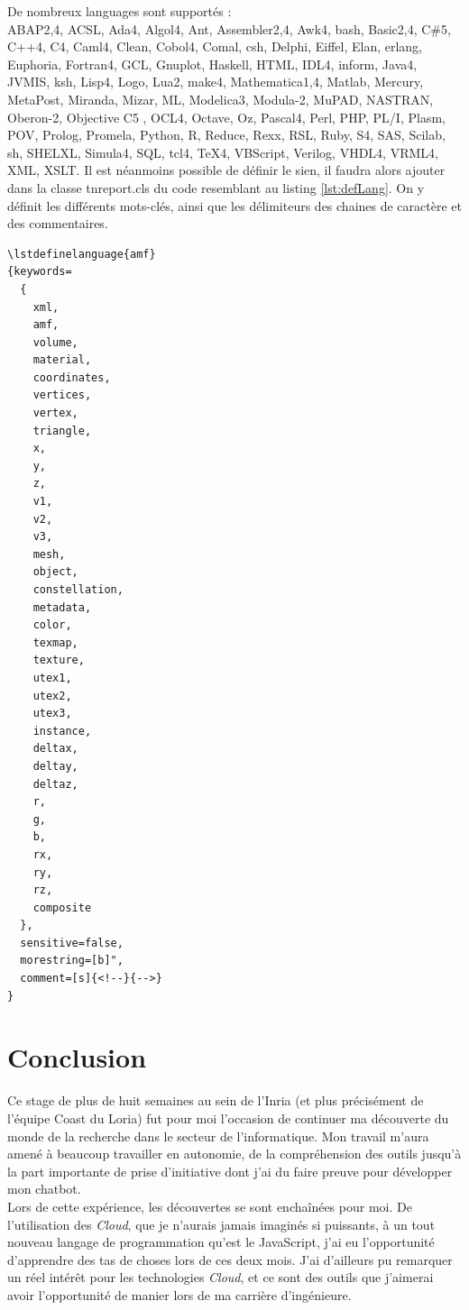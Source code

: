 \documentclass[stage2a]{tnreport} %
\begin{document}
{De nombreux languages sont supportés : \\
ABAP2,4, ACSL, Ada4, Algol4, Ant, Assembler2,4, Awk4, bash, Basic2,4, C\#5, C++4, C4, Caml4, Clean, Cobol4, Comal, csh, Delphi, Eiffel, Elan, erlang, Euphoria, Fortran4, GCL, Gnuplot, Haskell, HTML, IDL4, inform, Java4, JVMIS, ksh, Lisp4, Logo, Lua2, make4, Mathematica1,4, Matlab, Mercury, MetaPost, Miranda, Mizar, ML, Modelica3, Modula-2, MuPAD, NASTRAN, Oberon-2, Objective C5 , OCL4, Octave, Oz, Pascal4, Perl, PHP, PL/I, Plasm, POV, Prolog, Promela, Python, R, Reduce, Rexx, RSL, Ruby, S4, SAS, Scilab, sh, SHELXL, Simula4, SQL, tcl4, TeX4, VBScript, Verilog, VHDL4, VRML4, XML, XSLT.
\clearpage
Il est néanmoins possible de définir le sien, il faudra alors ajouter dans la classe tnreport.cls du code resemblant au listing \ref{lst:defLang}. On y définit les différents mots-clés, ainsi que les délimiteurs des chaines de caractère et des commentaires.
\begin{lstlisting}[language=Tex, caption={Syntaxe définition d'un langage}, label={lst:defLang}]
\lstdefinelanguage{amf}
{keywords=
  {
    xml,
    amf,
    volume,
    material,
    coordinates,
    vertices,
    vertex,
    triangle,
    x,
    y,
    z,
    v1,
    v2,
    v3,
    mesh,
    object,
    constellation,
    metadata,
    color,
    texmap,
    texture,
    utex1,
    utex2,
    utex3,
    instance,
    deltax,
    deltay,
    deltaz,
    r,
    g,
    b,
    rx,
    ry,
    rz,
    composite
  },
  sensitive=false,
  morestring=[b]",
  comment=[s]{<!--}{-->}
}
\end{lstlisting}}

\chapter{Conclusion}

Ce stage de plus de huit semaines au sein de l'Inria (et plus précisément de l'équipe Coast du Loria) fut pour moi l'occasion de continuer ma découverte du monde de la recherche dans le secteur de l'informatique. Mon travail m'aura amené à beaucoup travailler en autonomie, de la compréhension des outils jusqu'à la part importante de prise d'initiative dont j'ai du faire preuve pour développer mon chatbot. \\

Lors de cette expérience, les découvertes se sont enchaînées pour moi. De l'utilisation des \emph{Cloud}, que je n'aurais jamais imaginés si puissants, à un tout nouveau langage de programmation qu'est le JavaScript, j'ai eu l'opportunité d'apprendre des tas de choses lors de ces deux mois. J'ai d'ailleurs pu remarquer un réel intérêt pour les technologies \emph{Cloud}, et ce sont des outils que j'aimerai avoir l'opportunité de manier lors de ma carrière d'ingénieure.\\
\end{document}
